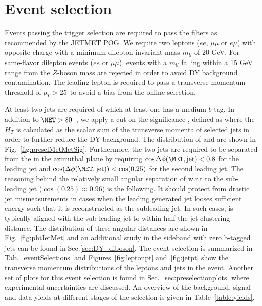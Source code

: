 \section{Event selection}
  Events passing the trigger selection are required to pass the \met filters as recommended by the JETMET POG\citep{twiki:metFilters}.
  We require two leptons ($ee$, $\mu\mu$ or $e\mu$) with opposite charge with a minimum dilepton invariant mass $m_{ll}$ of $20$ GeV. For same-flavor dilepton events ($ee$ or $\mu\mu$), events with a $m_{ll}$ 
  falling within a 15 GeV range from
  the $Z$-boson mass are rejected in order to avoid DY background contamination. The leading lepton is required to pass a transverse momentum threshold of $p_{T}>25$~\GeV to avoid a bias from the online selection. 

  At least two jets are required of which at least one has a medium $b$-tag. In addition to $\met > 80$~\GeV, we apply a cut on the \met significance \metSig, defined as
  \metSigFull where the $H_T$ is calculated as the scalar sum of the transverse momenta of selected jets in order to further reduce the DY background. The distribution of \ETmiss and \metSig are
  shown in Fig.~\ref{fig:preselMetMetSig}.
  Furthermore, the two jets are required to be separated from the \met in the azimuthal plane by requiring $\cos{\Delta\phi(\met, \text{jet})} < 0.8$ for
  the leading jet and $\cos(\Delta\phi(\met, \text{jet})) < \cos(0.25)$ for the second leading jet. 
The reasoning behind the relatively small angular separation of \ETmiss w.r.t to the sub-leading jet ($\cos(0.25)\approx 0.96$) is the following. 
It should protect from drastic 
jet mismeasurements in cases when the leading generated jet looses sufficient energy such that it is reconstructed as the subleading jet. 
In such cases, \ETmiss is typically aligned with the sub-leading jet to within half the jet clustering distance. The distribution of these angular distances are shown in Fig.~\ref{fig:phiJetMet} and
an additional study in the sideband with zero b-tagged jets can be found in Sec.\ref{sec:DY_diboson}.
The event selection is summarized in Tab.~\ref{eventSelections} and Figures~\ref{fig:leptonpt} and~\ref{fig:jetpt} show the transverse momentum distributions of the leptons and jets in the event.
Another set of plots for this event selection is found in Sec.~\ref{sec:preselectionplots} where experimental uncertainties are discussed.
An overview of the background, signal and data yields at different stages of the selection is given in Table~\ref{table:yields}.
  

